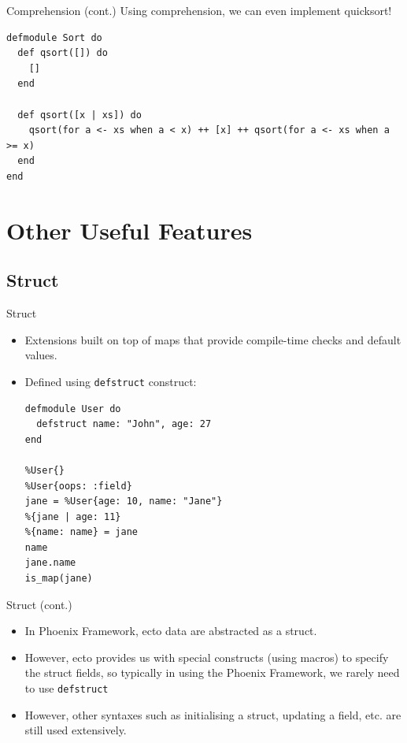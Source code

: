 \documentclass[12pt]{beamer}
\begin{document}
\begin{frame}[fragile]{Comprehension (cont.)}
  Using comprehension, we can even implement quicksort!
  \begin{verbatim}
defmodule Sort do
  def qsort([]) do
    []
  end

  def qsort([x | xs]) do
    qsort(for a <- xs when a < x) ++ [x] ++ qsort(for a <- xs when a >= x)
  end
end
  \end{verbatim}
\end{frame}

\section{Other Useful Features}
\subsection{Struct}
\begin{frame}[fragile]{Struct}
  \begin{itemize}
    \item Extensions built on top of maps that provide compile-time checks and default values.
    \item Defined using \texttt{defstruct} construct:
          \begin{verbatim}
defmodule User do
  defstruct name: "John", age: 27
end

%User{}
%User{oops: :field}
jane = %User{age: 10, name: "Jane"}
%{jane | age: 11}
%{name: name} = jane
name
jane.name
is_map(jane)
  \end{verbatim}
  \end{itemize}
\end{frame}

\begin{frame}{Struct (cont.)}
  \begin{itemize}
    \item In Phoenix Framework, ecto data are abstracted as a struct.
    \item However, ecto provides us with special constructs (using macros) to specify the struct fields, so typically in using the Phoenix Framework, we rarely need to use \texttt{defstruct}
    \item However, other syntaxes such as initialising a struct, updating a field, etc. are still used extensively.
  \end{itemize}
\end{frame}
\end{document}
